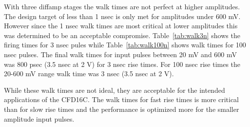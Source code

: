 \documentclass[12pt,oneside,final]{siuethesis}
\theoremstyle{definition}
\begin{document}
\par With three diffamp stages the walk times are not perfect at higher amplitudes. The design target of less than 1 nsec is only met for amplitudes under 600 mV. However since the 1 nsec walk times are most critical at lower amplitudes this was determined to be an acceptable compromise. Table~\ref{tab:walk3n} shows the firing times for 3 nsec pules while Table~\ref{tab:walk100n} shows walk times for 100 nsec pulses. The final walk times for input pulses between 20 mV and 600 mV was 800 psec (3.5 nsec at 2 V) for 3 nsec rise times. For 100 nsec rise times the 20-600 mV range walk time was 3 nsec (3.5 nsec at 2 V).
\par While these walk times are not ideal, they are acceptable for the intended applications of the CFD16C. The walk times for fast rise times is more critical than for slow rise times and the performance is optimized more for the smaller amplitude input pulses. 
\end{document}
